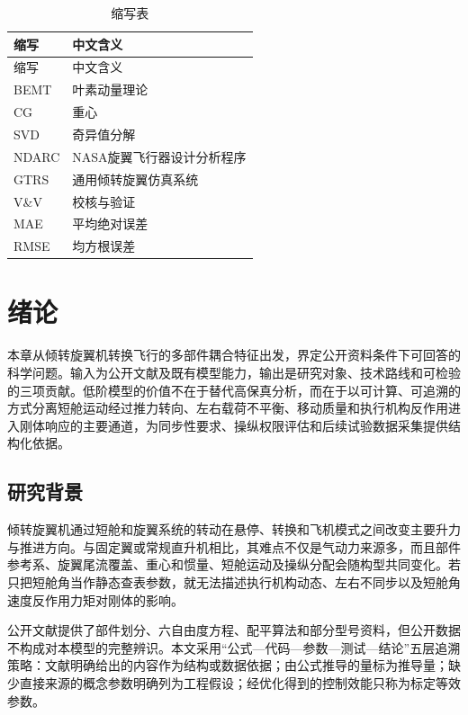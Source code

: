 \documentclass[UTF8,12pt,oneside,openany,fontset=windows]{ctexbook}
\begin{document}
\begin{center}
\scriptsize
\setlength{\tabcolsep}{1pt}
\begin{longtable}{>{\raggedright\arraybackslash}p{}>{\raggedright\arraybackslash}p{}}
\caption{缩写表}\\
\toprule
缩写 & 中文含义 \\
\midrule\endfirsthead
\toprule
缩写 & 中文含义 \\
\midrule\endhead
BEMT & 叶素动量理论 \\
CG & 重心 \\
SVD & 奇异值分解 \\
NDARC & NASA旋翼飞行器设计分析程序 \\
GTRS & 通用倾转旋翼仿真系统 \\
V\&V & 校核与验证 \\
MAE & 平均绝对误差 \\
RMSE & 均方根误差 \\
\bottomrule
\end{longtable}
\end{center}

\chapter{绪论}

本章从倾转旋翼机转换飞行的多部件耦合特征出发，界定公开资料条件下可回答的科学问题。输入为公开文献及既有模型能力，输出是研究对象、技术路线和可检验的三项贡献。低阶模型的价值不在于替代高保真分析，而在于以可计算、可追溯的方式分离短舱运动经过推力转向、左右载荷不平衡、移动质量和执行机构反作用进入刚体响应的主要通道，为同步性要求、操纵权限评估和后续试验数据采集提供结构化依据。

\section{研究背景}

倾转旋翼机通过短舱和旋翼系统的转动在悬停、转换和飞机模式之间改变主要升力与推进方向。与固定翼或常规直升机相比，其难点不仅是气动力来源多，而且部件参考系、旋翼尾流覆盖、重心和惯量、短舱运动及操纵分配会随构型共同变化。若只把短舱角当作静态查表参数，就无法描述执行机构动态、左右不同步以及短舱角速度反作用力矩对刚体的影响。

公开文献提供了部件划分、六自由度方程、配平算法和部分型号资料，但公开数据不构成对本模型的完整辨识。本文采用“公式—代码—参数—测试—结论”五层追溯策略：文献明确给出的内容作为结构或数据依据；由公式推导的量标为推导量；缺少直接来源的概念参数明确列为工程假设；经优化得到的控制效能只称为标定等效参数。
\end{document}
